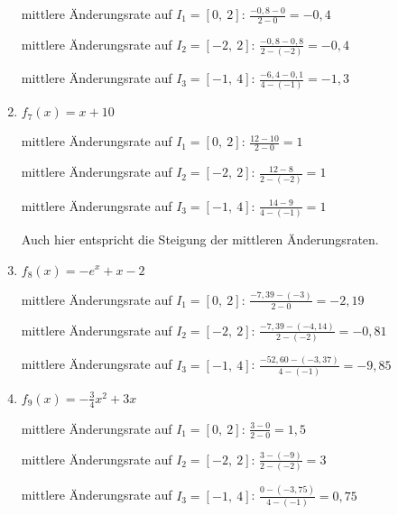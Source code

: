 \begin{Answer}[ref=aenderungsrateA2]
\begin{enumerate}[label=\alph*)]
		mittlere Änderungsrate auf \(I_1=[0,\ 2]\): \(\frac{-0,8-0}{2-0}=-0,4\)

		mittlere Änderungsrate auf \(I_2=[-2,\ 2]\): \(\frac{-0,8-0,8}{2-(-2)}=-0,4\)

		mittlere Änderungsrate auf \(I_3=[-1,\ 4]\): \(\frac{-6,4-0,1}{4-(-1)}=-1,3\)

		\item \(f_7(x)=x+10\)

		mittlere Änderungsrate auf \(I_1=[0,\ 2]\): \(\frac{12-10}{2-0}=1\)

		mittlere Änderungsrate auf \(I_2=[-2,\ 2]\): \(\frac{12-8}{2-(-2)}=1\)

		mittlere Änderungsrate auf \(I_3=[-1,\ 4]\): \(\frac{14-9}{4-(-1)}=1\)

		Auch hier entspricht die Steigung der mittleren Änderungsraten.
		\item \(f_8(x)=-e^x+x-2\)

		mittlere Änderungsrate auf \(I_1=[0,\ 2]\): \(\frac{-7,39-(-3)}{2-0}=-2,19\)

		mittlere Änderungsrate auf \(I_2=[-2,\ 2]\): \(\frac{-7,39-(-4,14)}{2-(-2)}=-0,81\)

		mittlere Änderungsrate auf \(I_3=[-1,\ 4]\): \(\frac{-52,60-(-3,37)}{4-(-1)}=-9,85\)

		\item \(f_9(x)=-\frac{3}{4}x^2+3x\)

		mittlere Änderungsrate auf \(I_1=[0,\ 2]\): \(\frac{3-0}{2-0}=1,5\)

		mittlere Änderungsrate auf \(I_2=[-2,\ 2]\): \(\frac{3-(-9)}{2-(-2)}=3\)

		mittlere Änderungsrate auf \(I_3=[-1,\ 4]\): \(\frac{0-(-3,75)}{4-(-1)}=0,75\)

	\end{enumerate}
\end{Answer}